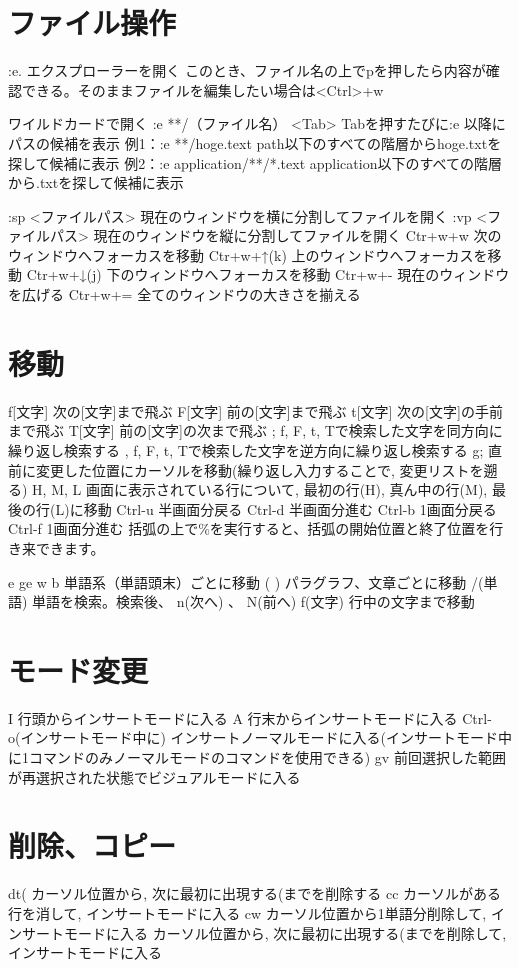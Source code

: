 \documentclass[11pt,a4paper]{jsarticle}
\begin{document}
%
\section{ファイル操作}
:e.	エクスプローラーを開く
    このとき、ファイル名の上でpを押したら内容が確認できる。そのままファイルを編集したい場合は<Ctrl>+w

ワイルドカードで開く
:e **/（ファイル名） <Tab>	Tabを押すたびに:e 以降にパスの候補を表示
例1：:e **/hoge.text	path以下のすべての階層からhoge.txtを探して候補に表示
例2：:e application/**/*.text	application以下のすべての階層から.txtを探して候補に表示

:sp <ファイルパス>	現在のウィンドウを横に分割してファイルを開く
:vp <ファイルパス>	現在のウィンドウを縦に分割してファイルを開く
Ctr+w+w	次のウィンドウへフォーカスを移動
Ctr+w+↑(k)	上のウィンドウへフォーカスを移動
Ctr+w+↓(j)	下のウィンドウへフォーカスを移動
Ctr+w+-	現在のウィンドウを広げる
Ctr+w+=	全てのウィンドウの大きさを揃える

\section{移動}
f[文字]	次の[文字]まで飛ぶ
F[文字]	前の[文字]まで飛ぶ
t[文字]	次の[文字]の手前まで飛ぶ
T[文字]	前の[文字]の次まで飛ぶ
;	f, F, t, Tで検索した文字を同方向に繰り返し検索する
,	f, F, t, Tで検索した文字を逆方向に繰り返し検索する
g;	直前に変更した位置にカーソルを移動(繰り返し入力することで, 変更リストを遡る)
H, M, L	画面に表示されている行について, 最初の行(H), 真ん中の行(M), 最後の行(L)に移動
Ctrl-u	半画面分戻る
Ctrl-d	半画面分進む
Ctrl-b	1画面分戻る
Ctrl-f	1画面分進む
括弧の上で\%を実行すると、括弧の開始位置と終了位置を行き来できます。

e ge w b	単語系（単語頭末）ごとに移動
{ } ( )	パラグラフ、文章ごとに移動
/(単語)	単語を検索。検索後、 n(次へ) 、 N(前へ)
f(文字)	行中の文字まで移動


\section{モード変更}
I	行頭からインサートモードに入る
A	行末からインサートモードに入る
Ctrl-o(インサートモード中に)	インサートノーマルモードに入る(インサートモード中に1コマンドのみノーマルモードのコマンドを使用できる)
gv	前回選択した範囲が再選択された状態でビジュアルモードに入る


\section{削除、コピー}
dt(	カーソル位置から, 次に最初に出現する(までを削除する
cc	カーソルがある行を消して, インサートモードに入る
cw	カーソル位置から1単語分削除して, インサートモードに入る
カーソル位置から, 次に最初に出現する(までを削除して, インサートモードに入る
\end{document}
